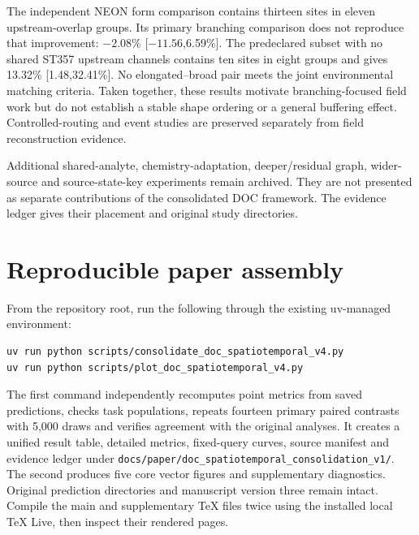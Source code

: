 \documentclass[10pt]{article}
\begin{document}
The independent NEON form comparison contains thirteen sites in eleven upstream-overlap groups. Its primary branching comparison does not reproduce that improvement: $-2.08$\% [$-11.56$,6.59\%]. The predeclared subset with no shared ST357 upstream channels contains ten sites in eight groups and gives 13.32\% [1.48,32.41\%]. No elongated--broad pair meets the joint environmental matching criteria. Taken together, these results motivate branching-focused field work but do not establish a stable shape ordering or a general buffering effect. Controlled-routing and event studies are preserved separately from field reconstruction evidence.

Additional shared-analyte, chemistry-adaptation, deeper/residual graph, wider-source and source-state-key experiments remain archived. They are not presented as separate contributions of the consolidated DOC framework. The evidence ledger gives their placement and original study directories.

\section{Reproducible paper assembly}
From the repository root, run the following through the existing uv-managed environment:
\begin{verbatim}
uv run python scripts/consolidate_doc_spatiotemporal_v4.py
uv run python scripts/plot_doc_spatiotemporal_v4.py
\end{verbatim}
The first command independently recomputes point metrics from saved predictions, checks task populations, repeats fourteen primary paired contrasts with 5,000 draws and verifies agreement with the original analyses. It creates a unified result table, detailed metrics, fixed-query curves, source manifest and evidence ledger under \nolinkurl{docs/paper/doc_spatiotemporal_consolidation_v1/}. The second produces five core vector figures and supplementary diagnostics. Original prediction directories and manuscript version three remain intact. Compile the main and supplementary TeX files twice using the installed local TeX Live, then inspect their rendered pages.
\end{document}
